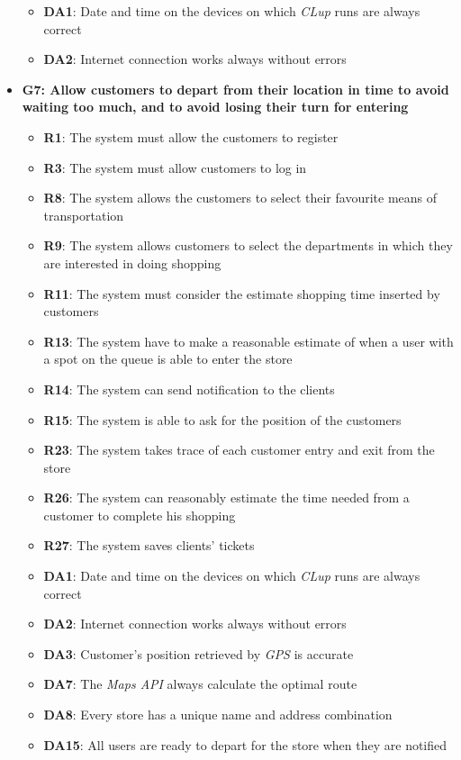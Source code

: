 \documentclass{article}
\begin{document}
\begin{itemize}
\begin{itemize}
						\item {\bfseries DA1}: Date and time on the devices on which \emph{CLup} runs are always correct
						\item {\bfseries DA2}: Internet connection works always without errors
							
					\end{itemize}

				 
				
				\item {\bfseries G7: Allow customers to depart from their location in time to avoid waiting too much, and to avoid losing their turn for entering}	

					\begin{itemize}
						\item {\bfseries R1}: The system must allow the customers to register
						\item {\bfseries R3}: The system must allow customers to log in
						\item {\bfseries R8}: The system allows the customers to select their favourite means of transportation
						\item {\bfseries R9}: The system allows customers to select the departments in which they are interested in doing shopping
						\item {\bfseries R11}: The system must consider the estimate shopping time inserted by customers
						\item {\bfseries R13}: The system have to make a reasonable estimate of when a user with a spot on the queue is able to enter the store
						\item {\bfseries R14}: The system can send notification to the clients
						\item {\bfseries R15}: The system is able to ask for the position of the customers
						\item {\bfseries R23}: The system takes trace of each customer entry and exit from the store
						\item {\bfseries R26}: The system can reasonably estimate the time needed from a customer to complete his shopping
						\item {\bfseries R27}: The system saves clients' tickets \\
					
						\item {\bfseries DA1}: Date and time on the devices on which \emph{CLup} runs are always correct
						\item {\bfseries DA2}: Internet connection works always without errors
						\item{\bfseries DA3}: Customer’s position retrieved by \emph{GPS} is accurate
						\item {\bfseries DA7}: The \emph{Maps API} always calculate the optimal route 
						\item {\bfseries DA8}: Every store has a unique name and address combination
						\item{\bfseries DA15}: All users are ready to depart for the store when they are notified
							

\end{itemize}
\end{itemize}
\end{document}
